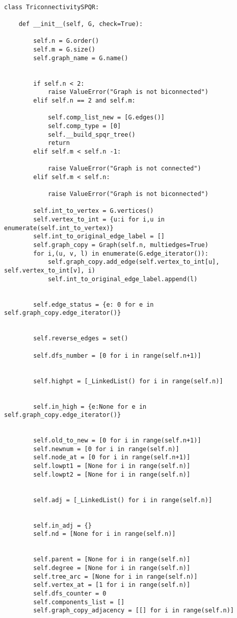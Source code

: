 \begin{center}


\begin{verbatim}

class TriconnectivitySPQR:

	def __init__(self, G, check=True):

		self.n = G.order()
		self.m = G.size()
		self.graph_name = G.name()


		if self.n < 2:
			raise ValueError("Graph is not biconnected")
		elif self.n == 2 and self.m:

			self.comp_list_new = [G.edges()]
			self.comp_type = [0]
			self.__build_spqr_tree()
			return
		elif self.m < self.n -1:

			raise ValueError("Graph is not connected")
		elif self.m < self.n:

			raise ValueError("Graph is not biconnected")

		self.int_to_vertex = G.vertices()
		self.vertex_to_int = {u:i for i,u in enumerate(self.int_to_vertex)}
		self.int_to_original_edge_label = []
		self.graph_copy = Graph(self.n, multiedges=True)
		for i,(u, v, l) in enumerate(G.edge_iterator()):
			self.graph_copy.add_edge(self.vertex_to_int[u], self.vertex_to_int[v], i)
			self.int_to_original_edge_label.append(l)


		self.edge_status = {e: 0 for e in self.graph_copy.edge_iterator()}


		self.reverse_edges = set()

		self.dfs_number = [0 for i in range(self.n+1)]


		self.highpt = [_LinkedList() for i in range(self.n)]


		self.in_high = {e:None for e in self.graph_copy.edge_iterator()}


		self.old_to_new = [0 for i in range(self.n+1)]
		self.newnum = [0 for i in range(self.n)]
		self.node_at = [0 for i in range(self.n+1)]
		self.lowpt1 = [None for i in range(self.n)]
		self.lowpt2 = [None for i in range(self.n)]


		self.adj = [_LinkedList() for i in range(self.n)]


		self.in_adj = {}
		self.nd = [None for i in range(self.n)]


		self.parent = [None for i in range(self.n)]
		self.degree = [None for i in range(self.n)]
		self.tree_arc = [None for i in range(self.n)]
		self.vertex_at = [1 for i in range(self.n)]
		self.dfs_counter = 0
		self.components_list = []
		self.graph_copy_adjacency = [[] for i in range(self.n)]



\end{verbatim}
\end{center}
